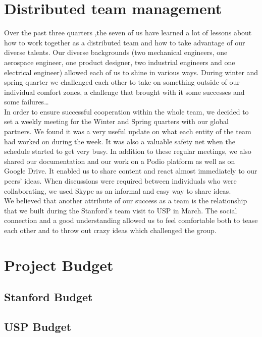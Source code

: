 \section{Distributed team management}

Over the past three quarters ,the seven of us have learned a lot of lessons about how to work together as a distributed team and how to take advantage of our diverse talents. Our diverse backgrounds (two mechanical engineers, one aerospace engineer, one product designer, two industrial engineers and one electrical engineer) allowed each of us to shine in various ways. During winter and spring quarter we challenged each other to take on something outside of our individual comfort zones, a challenge that brought with it some successes and some failures…\\

In order to ensure successful cooperation within the whole team, we decided to set a weekly meeting for the Winter and Spring quarters with our global partners. We found it was a very useful update on what each entity of the team had worked on during the week. It was also a valuable safety net when the schedule started to get very busy. In addition to these regular meetings, we also shared our documentation and our work on a Podio platform as well as on Google Drive. It enabled us to share content and react almost immediately to our peers’ ideas. When discussions were required between individuals who were collaborating, we used Skype as an informal and easy way to share ideas.\\

We believed that another attribute of our success as a team is the relationship that we built during the Stanford’s team visit to USP in March. The social connection and a good understanding allowed us to feel comfortable both to tease each other and to throw out crazy ideas which challenged the group.


\section{Project Budget}

\subsection{Stanford Budget}

\subsection{USP Budget}
 
